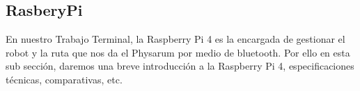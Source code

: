 \subsection{RasberyPi} %
\label{sub:Rasbery}
    En nuestro Trabajo Terminal, la Raspberry Pi 4 es la encargada de gestionar el robot y la ruta que nos da el 
        Physarum por medio de bluetooth. Por ello en esta sub secci\'on, daremos una breve introducci\'on a la Raspberry Pi 4,
        especificaciones t\'ecnicas, comparativas, etc.
    \vskip 0.5cm
    
    
    